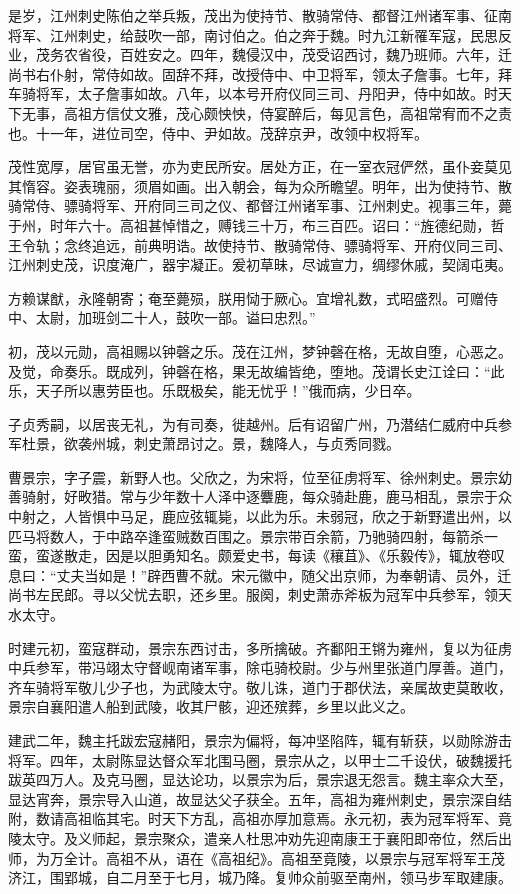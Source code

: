 \documentclass[12pt,UTF8]{ctexbook}
\begin{document}
是岁，江州刺史陈伯之举兵叛，茂出为使持节、散骑常侍、都督江州诸军事、征南将军、江州刺史，给鼓吹一部，南讨伯之。伯之奔于魏。时九江新罹军寇，民思反业，茂务农省役，百姓安之。四年，魏侵汉中，茂受诏西讨，魏乃班师。六年，迁尚书右仆射，常侍如故。固辞不拜，改授侍中、中卫将军，领太子詹事。七年，拜车骑将军，太子詹事如故。八年，以本号开府仪同三司、丹阳尹，侍中如故。时天下无事，高祖方信仗文雅，茂心颇怏怏，侍宴醉后，每见言色，高祖常宥而不之责也。十一年，进位司空，侍中、尹如故。茂辞京尹，改领中权将军。

茂性宽厚，居官虽无誉，亦为吏民所安。居处方正，在一室衣冠俨然，虽仆妾莫见其惰容。姿表瑰丽，须眉如画。出入朝会，每为众所瞻望。明年，出为使持节、散骑常侍、骠骑将军、开府同三司之仪、都督江州诸军事、江州刺史。视事三年，薨于州，时年六十。高祖甚悼惜之，赙钱三十万，布三百匹。诏曰：“旌德纪勋，哲王令轨；念终追远，前典明诰。故使持节、散骑常侍、骠骑将军、开府仪同三司、江州刺史茂，识度淹广，器宇凝正。爰初草昧，尽诚宣力，绸缪休戚，契阔屯夷。

方赖谋猷，永隆朝寄；奄至薨殒，朕用恸于厥心。宜增礼数，式昭盛烈。可赠侍中、太尉，加班剑二十人，鼓吹一部。谥曰忠烈。”

初，茂以元勋，高祖赐以钟磬之乐。茂在江州，梦钟磬在格，无故自堕，心恶之。及觉，命奏乐。既成列，钟磬在格，果无故编皆绝，堕地。茂谓长史江诠曰：“此乐，天子所以惠劳臣也。乐既极矣，能无忧乎！”俄而病，少日卒。

子贞秀嗣，以居丧无礼，为有司奏，徙越州。后有诏留广州，乃潜结仁威府中兵参军杜景，欲袭州城，刺史萧昂讨之。景，魏降人，与贞秀同戮。

曹景宗，字子震，新野人也。父欣之，为宋将，位至征虏将军、徐州刺史。景宗幼善骑射，好畋猎。常与少年数十人泽中逐麞鹿，每众骑赴鹿，鹿马相乱，景宗于众中射之，人皆惧中马足，鹿应弦辄毙，以此为乐。未弱冠，欣之于新野遣出州，以匹马将数人，于中路卒逢蛮贼数百围之。景宗带百余箭，乃驰骑四射，每箭杀一蛮，蛮遂散走，因是以胆勇知名。颇爱史书，每读《穰苴》、《乐毅传》，辄放卷叹息曰：“丈夫当如是！”辟西曹不就。宋元徽中，随父出京师，为奉朝请、员外，迁尚书左民郎。寻以父忧去职，还乡里。服阕，刺史萧赤斧板为冠军中兵参军，领天水太守。

时建元初，蛮寇群动，景宗东西讨击，多所擒破。齐鄱阳王锵为雍州，复以为征虏中兵参军，带冯翊太守督岘南诸军事，除屯骑校尉。少与州里张道门厚善。道门，齐车骑将军敬儿少子也，为武陵太守。敬儿诛，道门于郡伏法，亲属故吏莫敢收，景宗自襄阳遣人船到武陵，收其尸骸，迎还殡葬，乡里以此义之。

建武二年，魏主托跋宏寇赭阳，景宗为偏将，每冲坚陷阵，辄有斩获，以勋除游击将军。四年，太尉陈显达督众军北围马圈，景宗从之，以甲士二千设伏，破魏援托跋英四万人。及克马圈，显达论功，以景宗为后，景宗退无怨言。魏主率众大至，显达宵奔，景宗导入山道，故显达父子获全。五年，高祖为雍州刺史，景宗深自结附，数请高祖临其宅。时天下方乱，高祖亦厚加意焉。永元初，表为冠军将军、竟陵太守。及义师起，景宗聚众，遣亲人杜思冲劝先迎南康王于襄阳即帝位，然后出师，为万全计。高祖不从，语在《高祖纪》。高祖至竟陵，以景宗与冠军将军王茂济江，围郢城，自二月至于七月，城乃降。复帅众前驱至南州，领马步军取建康。
\end{document}
